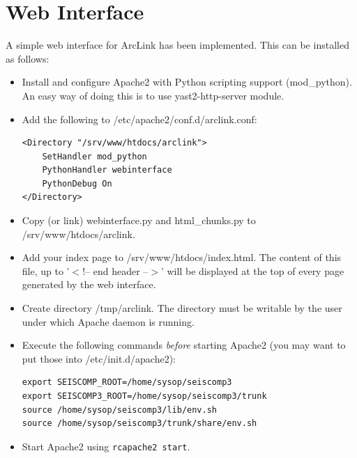 \documentclass[11pt,a4paper,titlepage]{article}
\newcommand{\cmd}[1]{\texttt{#1}}
\begin{document}
\section{Web Interface}

A simple web interface for ArcLink has been implemented. This can be installed as follows:
\begin{itemize}
\item Install and configure Apache2 with Python scripting support
(mod\_python). An easy way of doing this is to use yast2-http-server
module.

\item Add the following to /etc/apache2/conf.d/arclink.conf:
\begin{verbatim}
<Directory "/srv/www/htdocs/arclink">
    SetHandler mod_python
    PythonHandler webinterface
    PythonDebug On
</Directory>
\end{verbatim}

\item Copy (or link) webinterface.py and html\_chunks.py to
/srv/www/htdocs/arclink.

\item Add your index page to /srv/www/htdocs/index.html. The content of
this file, up to '$<$!-- end header --$>$' will be displayed at the top of
every page generated by the web interface.

\item Create directory /tmp/arclink. The directory must be writable by the
user under which Apache daemon is running.

\item Execute the following commands \emph{before} starting Apache2 (you may
want to put those into /etc/init.d/apache2):
\begin{verbatim}
export SEISCOMP_ROOT=/home/sysop/seiscomp3
export SEISCOMP3_ROOT=/home/sysop/seiscomp3/trunk
source /home/sysop/seiscomp3/lib/env.sh
source /home/sysop/seiscomp3/trunk/share/env.sh
\end{verbatim}

\item Start Apache2 using \cmd{rcapache2 start}.
\end{itemize}
\end{document}
